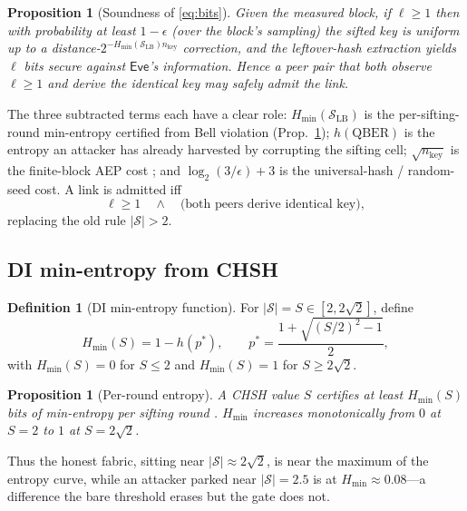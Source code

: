 \documentclass[11pt,a4paper]{article}
\newcommand{\CHSH}{\mathcal{S}}
\newcommand{\Eve}{\mathsf{Eve}}
\newcommand{\eps}{\epsilon}
\newcommand{\QBER}{\mathrm{QBER}}
\newcommand{\Hmin}{H_{\min}}
\newcommand{\SLB}{\mathcal{S}_{\mathrm{LB}}}
\newcommand{\bits}{\ell}
\newcommand{\bell}{2\sqrt{2}}
\theoremstyle{plain}
\newtheorem{proposition}[theorem]{Proposition}
\theoremstyle{definition}
\newtheorem{definition}[theorem]{Definition}
\begin{document}
\begin{proposition}[Soundness of \eqref{eq:bits}]
Given the measured block, if $\bits \ge 1$ then with probability at least
$1-\eps$ (over the block's sampling) the sifted key is uniform up to a
distance-$2^{-\Hmin(\SLB)n_{\mathrm{key}}}$ correction, and the leftover-hash
extraction yields $\bits$ bits secure against $\Eve$'s information. Hence a
peer pair that both observe $\bits \ge 1$ and derive the identical key may
safely admit the link.
\end{proposition}
The three subtracted terms each have a clear role: $\Hmin(\SLB)$ is the
per-sifting-round min-entropy certified from Bell violation (Prop.~\ref{prop:dmin});
$h(\QBER)$ is the entropy an attacker has already harvested by corrupting the
sifting cell; $\sqrt{n_{\mathrm{key}}}$ is the finite-block AEP cost
\citep{tomamichel2012finite}; and $\log_2(3/\eps)+3$ is the universal-hash /
random-seed cost. A link is admitted iff
\begin{equation}
\bits \ge 1 \quad\wedge\quad \text{(both peers derive identical key)},
\label{eq:admit}
\end{equation}
replacing the old rule $|\CHSH| > 2$.

\subsection{DI min-entropy from CHSH}
\begin{definition}[DI min-entropy function]
For $|\CHSH| = S \in [2,\bell]$, define
\[
\Hmin(S) = 1 - h(p^\ast), \qquad
p^\ast = \frac{1+\sqrt{(S/2)^2-1}}{2},
\]
with $\Hmin(S)=0$ for $S\le2$ and $\Hmin(S)=1$ for $S\ge\bell$.
\end{definition}
\begin{proposition}[Per-round entropy]
\label{prop:dmin}
A CHSH value $S$ certifies at least $\Hmin(S)$ bits of min-entropy per sifting
round \citep{pironio2009device,acin2012device}. $\Hmin$ increases monotonically
from $0$ at $S=2$ to $1$ at $S=\bell$.
\end{proposition}
Thus the honest fabric, sitting near $|\CHSH|\approx\bell$, is near the maximum
of the entropy curve, while an attacker parked near $|\CHSH| = 2.5$ is at
$\Hmin \approx 0.08$---a difference the bare threshold erases but the gate does
not.
\end{document}
